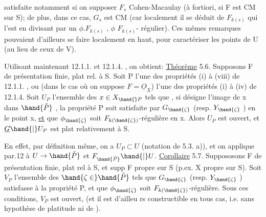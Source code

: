 
satisfaite notamment si on supposer $F_s$ Cohen-Macaulay (à fortiori, si
F est CM sur S); de plus, dans ce cas, $G_s$ est CM (car localement il se
déduit de $F_{k(s)}$ qui l'est en divisant par un $\phi . F_{k(s)}$ ,   $\phi$  $F_{k(s)}$-%
régulier). Ces mêmes remarques pouvaient  d'ailleurs se faire localement
en haut, pour caractériser les points de U (au lieu de ceux de V).

Utilisant maintenant 12.1.1. et 12.1.4. , on obtient:
\uline{Théorème} 5.6. Supposons F de présentation finie, plat rel. à S. Soit
P l'une des propriétés 
 (i) à (viii) de 12.1.1. ,
ou  (dans le cas où on suppose $F=\underline{O}_X$) l'une des
 propriétés (i) à (iv)\hand{/} de 12.1.4. Soit
 $U_P$  l'ensemble des $x \in X_{\hand{\check{}}P}$ tels que , si \hand{$\zeta$}
 désigne l'image de x dans $\hand{\check{P}}$ , la propriété P soit satisfaite
par $G_{\hand{\zeta}}$ (resp.  $Y_{\hand{\zeta}}$ ) en le point x, \uline{et} que $\phi_{\hand{\zeta}}$ soit $F_{k(\hand{\zeta})}$-régulière en x.
Alors $U_P$ est ouvert, et $\underline{G}\hand{|}U_P$ est plat relativement à S.

En effet, par définition même, on a $U_P \subset U$ (notation de 5.3. a)),
et on applique par.12 à $U \to \hand{\check{P}}$ et $F_{\hand{\check{P}}}\hand{|}U$.
\uline{Corollaire} 5.7. Suppososons F de présentation finie, plat rel à S,
et supp F propre sur S (p.ex. X propre sur S). Soit $V_P$ l'ensemble des
$\hand{\zeta\in}\hand{\check{P}}$ tels que $G_{\hand{\zeta}}$ (resp. $Y_{\hand{\zeta}}$ ) satisfasse à la propriété P, et que $\phi_{\hand{\zeta}}$ soit
$F_{k(\hand{\zeta})}$-régulière. Sous ces conditions, $V_P$ est ouvert, (et il est d'ailleu
rs constructible en tous cas, i.e. sans hypothèse de platitude ni de
).

